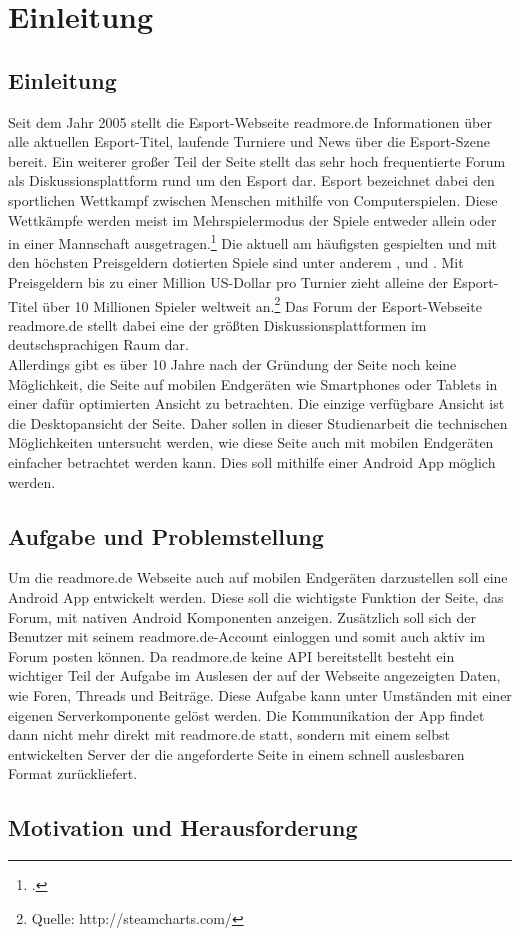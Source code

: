 \chapter{Einleitung}
\label{cha:Einleitung}

\section{Einleitung}
Seit dem Jahr 2005 stellt die Esport-Webseite readmore.de Informationen über
alle aktuellen Esport-Titel, laufende Turniere und News über die Esport-Szene
bereit. Ein weiterer großer Teil der Seite stellt das sehr hoch frequentierte
Forum als Diskussionsplattform rund um den Esport dar. Esport bezeichnet dabei
den sportlichen Wettkampf zwischen Menschen mithilfe von Computerspielen. Diese
Wettkämpfe werden meist im Mehrspielermodus der Spiele entweder allein oder in
einer Mannschaft ausgetragen.\footcite{TEST1234} Die aktuell am häufigsten
gespielten und mit den höchsten Preisgeldern dotierten Spiele sind unter anderem ,
 und .
Mit Preisgeldern bis zu einer Million US-Dollar pro Turnier zieht alleine der
Esport-Titel  über 10 Millionen Spieler weltweit
an.\footnote{Quelle:
http://steamcharts.com/}
Das Forum der Esport-Webseite readmore.de stellt dabei eine der größten
Diskussionsplattformen im deutschsprachigen Raum dar. \\
Allerdings gibt es über 10 Jahre nach der Gründung der Seite noch keine
Möglichkeit, die Seite auf mobilen Endgeräten wie Smartphones oder Tablets in
einer dafür optimierten Ansicht zu betrachten. Die einzige verfügbare Ansicht
ist die Desktopansicht der Seite. Daher sollen in dieser Studienarbeit die
technischen Möglichkeiten untersucht werden, wie diese Seite auch mit mobilen
Endgeräten einfacher betrachtet werden kann. Dies soll mithilfe einer Android
App möglich werden.
\section{Aufgabe und Problemstellung}
Um die readmore.de Webseite auch auf mobilen Endgeräten darzustellen soll eine
Android App entwickelt werden. Diese soll die wichtigste Funktion der Seite, das
Forum, mit nativen Android Komponenten anzeigen. Zusätzlich soll sich der
Benutzer mit seinem readmore.de-Account einloggen und somit auch aktiv im Forum
posten können. Da readmore.de keine API bereitstellt besteht ein wichtiger Teil
der Aufgabe im Auslesen der auf der Webseite angezeigten Daten, wie Foren, Threads und Beiträge. Diese
Aufgabe kann unter Umständen mit einer eigenen Serverkomponente gelöst werden.
Die Kommunikation der App findet dann nicht mehr direkt mit readmore.de statt,
sondern mit einem selbst entwickelten Server der die angeforderte Seite in einem
schnell auslesbaren Format zurückliefert. 
\section{Motivation und Herausforderung}
